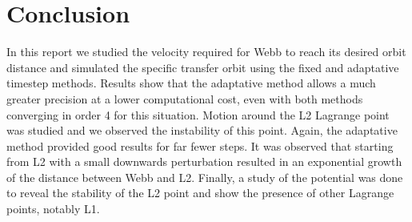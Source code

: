 \section{Conclusion}

In this report we studied the velocity required for Webb to reach its desired orbit distance and simulated the specific transfer orbit using the fixed and adaptative timestep methods. Results show that the adaptative method allows a much greater precision at a lower computational cost, even with both methods converging in order 4 for this situation. Motion around the L2 Lagrange point was studied and we observed the instability of this point. Again, the adaptative method provided good results for far fewer steps. It was observed that starting from L2 with a small downwards perturbation resulted in an exponential growth of the distance between Webb and L2. Finally, a study of the potential was done to reveal the stability of the L2 point and show the presence of other Lagrange points, notably L1.